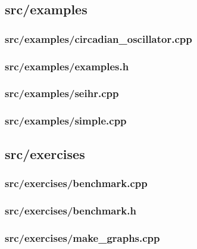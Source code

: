 \newpage
\subsection{src/examples}
\subsubsection{src/examples/circadian\_oscillator.cpp}

\newpage
\subsubsection{src/examples/examples.h}

\newpage
\subsubsection{src/examples/seihr.cpp}

\newpage
\subsubsection{src/examples/simple.cpp}


\newpage
\subsection{src/exercises}
\subsubsection{src/exercises/benchmark.cpp}

\newpage
\subsubsection{src/exercises/benchmark.h}

\newpage
\subsubsection{src/exercises/make\_graphs.cpp}

\newpage
